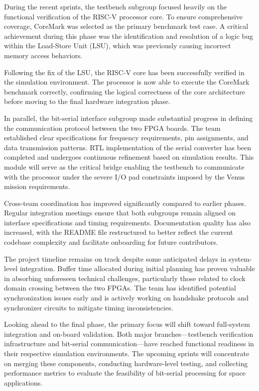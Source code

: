 \documentclass[10pt]{article}
\begin{document}
During the recent sprints, the testbench subgroup focused heavily on the functional verification of the RISC-V processor core. To ensure comprehensive coverage, CoreMark was selected as the primary benchmark test case. A critical achievement during this phase was the identification and resolution of a logic bug within the Load-Store Unit (LSU), which was previously causing incorrect memory access behaviors.

Following the fix of the LSU, the RISC-V core has been successfully verified in the simulation environment. The processor is now able to execute the CoreMark benchmark correctly, confirming the logical correctness of the core architecture before moving to the final hardware integration phase.

In parallel, the bit-serial interface subgroup made substantial progress in defining the communication protocol between the two FPGA boards. The team established clear specifications for frequency requirements, pin assignments, and data transmission patterns. RTL implementation of the serial converter has been completed and undergoes continuous refinement based on simulation results. This module will serve as the critical bridge enabling the testbench to communicate with the processor under the severe I/O pad constraints imposed by the Venus mission requirements.

Cross-team coordination has improved significantly compared to earlier phases. Regular integration meetings ensure that both subgroups remain aligned on interface specifications and timing requirements. Documentation quality has also increased, with the README file restructured to better reflect the current codebase complexity and facilitate onboarding for future contributors.

The project timeline remains on track despite some anticipated delays in system-level integration. Buffer time allocated during initial planning has proven valuable in absorbing unforeseen technical challenges, particularly those related to clock domain crossing between the two FPGAs. The team has identified potential synchronization issues early and is actively working on handshake protocols and synchronizer circuits to mitigate timing inconsistencies.

Looking ahead to the final phase, the primary focus will shift toward full-system integration and on-board validation. Both major branches—testbench verification infrastructure and bit-serial communication—have reached functional readiness in their respective simulation environments. The upcoming sprints will concentrate on merging these components, conducting hardware-level testing, and collecting performance metrics to evaluate the feasibility of bit-serial processing for space applications.
\end{document}
